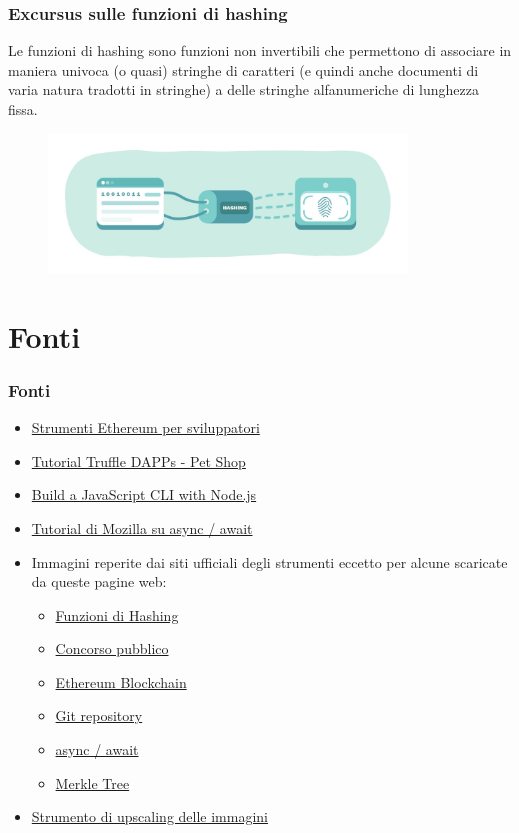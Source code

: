 \documentclass{beamer}
\begin{document}
\begin{frame}
	\frametitle{Excursus sulle funzioni di hashing}
	Le funzioni di hashing sono funzioni non invertibili che permettono di associare in maniera univoca (o quasi) stringhe di caratteri (e quindi anche documenti di varia natura tradotti in stringhe) a delle stringhe alfanumeriche di lunghezza fissa.
	\bigskip
	\begin{figure}
		\includegraphics[width=0.85\textwidth]{figures/hashing.jpg}
	\end{figure}
\end{frame}

\section{Fonti}
\begin{frame}
	\frametitle{Fonti}
	\begin{itemize}
		\item \href{https://ethereum.org/it/developers/}{Strumenti Ethereum per sviluppatori} 
  		\item \href{https://www.trufflesuite.com/tutorial}{Tutorial Truffle DAPPs - Pet Shop}
  		\item \href{https://www.sitepoint.com/javascript-command-line-interface-cli-node-js/}{Build a JavaScript CLI with Node.js}
  		\item \href{https://developer.mozilla.org/en-US/docs/Learn/JavaScript/Asynchronous/Async_await}{Tutorial di Mozilla su async / await}
  		\item Immagini reperite dai siti ufficiali degli strumenti eccetto per alcune scaricate da queste pagine web:
			\begin{itemize}
				\item \href{https://www.poeticoding.com/hashing-a-file-in-elixir/}{Funzioni di Hashing}
				\item \href{https://www.romatoday.it/attualita/concorso-rai-fiera-roma-norme-covid-19.html}{Concorso pubblico}
				\item \href{https://www.criptovalute24.com/ethereum-migliora-la-sua-blockchain-rialzo-del-5-4/}{Ethereum Blockchain}
				\item \href{https://blog.netsons.com/git-software-guida-facile/}{Git repository}
				\item \href{https://amerlin.keantex.com/programmazione-asincrona-con-async-await-parte-2/}{async / await}
				\item \href{https://transparency.dev/verifiable-data-structures/}{Merkle Tree}
			\end{itemize}
			\item \href{https://waifu2x.booru.pics/Home/index}{Strumento di upscaling delle immagini} 
	\end{itemize}
\end{frame}
\end{document}
